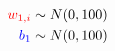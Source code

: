 \documentclass[10pt]{article}
\begin{document}
\begin{align*}\color{red}w_{1, i}\color{black} \sim N(0, 100)\\
\color{blue}b_{1}\color{black} \sim N(0, 100)\\\end{align*}
\end{document}
